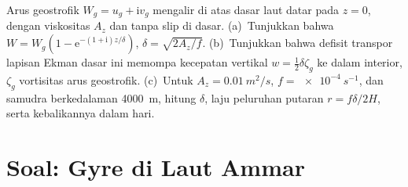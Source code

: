 \begin{exercise}[$\star\star\star$]\label{exo:b3:ocean-dynamics:12}
Arus geostrofik $W_g = u_g + \mathrm iv_g$ mengalir di atas dasar laut
datar pada $z = 0$, dengan viskositas  $A_z$ dan tanpa slip di dasar.
(a)~Tunjukkan bahwa $W = W_g(1 - \mathrm e^{-(1+\mathrm i)z/\delta})$, $\delta =
\sqrt{2A_z/f}$. (b)~Tunjukkan bahwa defisit transpor lapisan Ekman dasar ini
memompa kecepatan vertikal $w = \tfrac12\delta\zeta_g$ ke dalam
interior, $\zeta_g$ vortisitas arus geostrofik. (c)~Untuk
$A_z = \qty{0.01}{m^2/s}$, $f = \qty{e-4}{s^{-1}}$, dan samudra
berkedalaman \qty{4000}{m}, hitung $\delta$, laju peluruhan putaran $r =
f\delta/2H$, serta kebalikannya dalam hari.
\end{exercise}

\section{Soal: Gyre di Laut Ammar}


